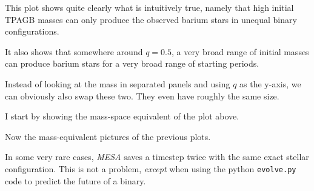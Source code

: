 \documentclass[a4paper,10pt]{article}
\begin{document}
This plot shows quite clearly what is intuitively true, namely that high initial TPAGB masses can only produce the observed barium stars in unequal binary configurations.

It also shows that somewhere around \(q=0.5\), a very broad range of initial masses can produce barium stars for a very broad range of starting periods.




Instead of looking at the mass in separated panels and using \(q\) as the y-axis, we can obviously also swap these two. They even have roughly the same size.

I start by showing the mass-space equivalent of the plot above.
\begin{figure}[ht]
    \centering
\end{figure}

Now the mass-equivalent pictures of the previous plots.

\begin{figure}[ht]
    \centering
\end{figure}


\begin{figure}[ht]
    \centering
\end{figure}

\nextpage
\begin{figure}[ht]
    \centering
\end{figure}

\begin{figure}[ht]
    \centering
\end{figure}

\nextpage
\begin{figure}[ht]
    \centering
\end{figure}


\begin{figure}[ht]
    \centering
\end{figure}



In some very rare cases, \emph{MESA} saves a timestep twice with the same exact stellar configuration. This is not a problem, \emph{except} when using the python \lstinline[style=output, breaklines=true]|evolve.py| code to predict the future of a binary.
\end{document}
